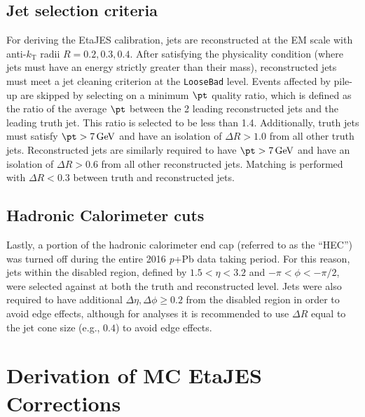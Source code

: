 \documentclass[NOTE, atlasdraft=true, texlive=2016, USenglish]{\ATLASLATEXPATH atlasdoc}
\begin{document}
\subsection{Jet selection criteria}
For deriving the EtaJES calibration, jets are reconstructed at the EM scale with anti-$k_{\text{T}}$ radii $R=0.2, 0.3, 0.4$. After satisfying the physicality condition (where jets must have an energy strictly greater than their mass), reconstructed jets must meet a jet cleaning criterion at the \texttt{LooseBad} level. Events affected by pile-up are skipped by selecting on a minimum $\pt$ quality ratio, which is defined as the ratio of the average $\pt$ between the 2 leading reconstructed jets and the leading truth jet. This ratio is selected to be less than 1.4. Additionally, truth jets must satisfy $\pt > \SI{7}{\GeV}$ and have an isolation of $\Delta R > 1.0$ from all other truth jets. Reconstructed jets are similarly required to have $\pt > \SI{7}{\GeV}$ and have an isolation of $\Delta R > 0.6$ from all other reconstructed jets. Matching is performed with $\Delta R < 0.3$ between truth and reconstructed jets.
\subsection{Hadronic Calorimeter cuts}
Lastly, a portion of the hadronic calorimeter end cap (referred to as the ``HEC'') was turned off during the entire 2016 \textit{p}+Pb data taking period. For this reason, jets within the disabled region, defined by $1.5<\eta<3.2$ and $-\pi<\phi<-\pi/2$, were selected against at both the truth and reconstructed level. Jets were also required to have additional $\Delta\eta, \Delta\phi \geq 0.2$ from the disabled region in order to avoid edge effects, although for analyses it is recommended to use $\Delta R$ equal to the jet cone size (e.g., $0.4$) to avoid edge effects.

%


\section{Derivation of MC EtaJES Corrections}
\label{sec:EtaJES}
\end{document}
